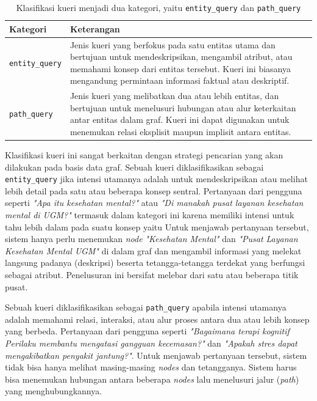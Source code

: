 \begin{table}[H]
	\centering
	\caption{Klasifikasi kueri menjadi dua kategori, yaitu \texttt{entity\_query} dan \texttt{path\_query}}
	\label{tab:query-classification}
	\begin{tabular}{|l|p{8cm}|}
		\hline
		\textbf{Kategori}      & \textbf{Keterangan}                                               \\
		\hline
		\texttt{entity\_query} &
		Jenis kueri yang berfokus pada satu entitas utama dan bertujuan untuk mendeskripsikan, mengambil atribut, atau memahami konsep dari entitas tersebut.
		Kueri ini biasanya mengandung permintaan informasi faktual atau deskriptif.                \\
		\hline
		\texttt{path\_query}   &
		Jenis kueri yang melibatkan dua atau lebih entitas, dan bertujuan untuk menelusuri hubungan atau alur keterkaitan antar entitas dalam graf.
		Kueri ini dapat digunakan untuk menemukan relasi eksplisit maupun implisit antara entitas. \\
		\hline
	\end{tabular}
\end{table}

Klasifikasi kueri ini sangat berkaitan dengan strategi pencarian yang akan dilakukan pada basis data graf.
Sebuah kueri diklasifikasikan sebagai \texttt{entity\_query} jika intensi utamanya adalah untuk mendeskripsikan atau melihat lebih detail pada satu atau beberapa konsep sentral.
Pertanyaan dari pengguna seperti \textit{"Apa itu kesehatan mental?"} atau \textit{"Di manakah pusat layanan kesehatan mental di UGM?"} termasuk dalam kategori ini karena memiliki intensi untuk tahu lebih dalam pada suatu konsep yaitu
Untuk menjawab pertanyaan tersebut, sistem hanya perlu menemukan \textit{node} \textit{"Kesehatan Mental"} dan \textit{"Pusat Layanan Kesehatan Mental UGM"} di dalam graf dan mengambil informasi yang melekat langsung padanya (deskripsi) beserta tetangga-tetangga terdekat yang berfungsi sebagai atribut.
Penelusuran ini bersifat melebar dari satu atau beberapa titik pusat.

Sebuah kueri diklasifikasikan sebagai \texttt{path\_query} apabila intensi utamanya adalah memahami relasi, interaksi, atau alur proses antara dua atau lebih konsep yang berbeda.
Pertanyaan dari pengguna seperti \textit{"Bagaimana terapi kognitif Perilaku membantu mengatasi gangguan kecemasan?"} dan \textit{"Apakah stres dapat mengakibatkan penyakit jantung?"}.
Untuk menjawab pertanyaan tersebut, sistem tidak bisa hanya melihat masing-masing \textit{nodes} dan tetangganya.
Sistem harus bisa menemukan hubungan antara beberapa \textit{nodes} lalu menelusuri jalur (\textit{path}) yang menghubungkannya.

